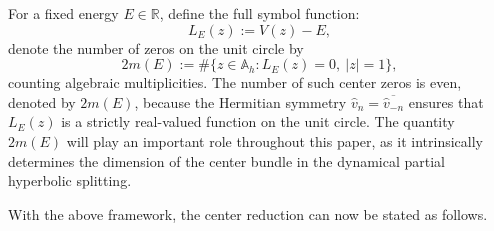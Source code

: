 \documentclass[reqno,11pt]{amsart}
\begin{document}
For a fixed energy $E\in\mathbb R$, define the full symbol function:
\begin{equation}\label{equ:symbol}
    L_{E}^{}(z) := V(z) - E,
\end{equation} denote the number of zeros on the unit circle by
\begin{equation}\label{zero}
    2m(E) := \#\{z\in\mathbb A_h: L_{E}^{}(z)=0,\ |z|=1\},
\end{equation}
counting algebraic multiplicities. The number of such center zeros is  even, denoted by $2m(E)$, because the Hermitian symmetry $\hat{v}_n = \overline{\hat{v}_{-n}}$ ensures that $L_{E}^{}(z)$ is a strictly real-valued function on the unit circle.  The quantity $2m(E)$ will play an important role throughout this paper, as it intrinsically determines the dimension of the center bundle in the dynamical partial hyperbolic splitting.

With the above framework, the center reduction can now be stated as follows.
\end{document}
